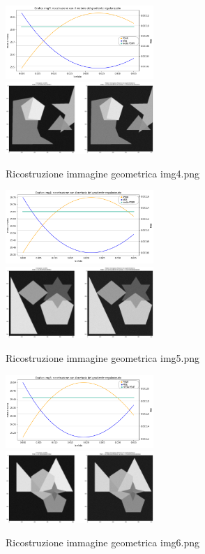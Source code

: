 \begin{figure}[H]
    \includegraphics[width=0.5\textwidth]{IMMAGINI_RELAZIONE/grafico4Tik.png}
    \includegraphics[width=0.5\textwidth]{IMMAGINI_RELAZIONE/ricostruzione4Tik.png}
    \caption{Ricostruzione immagine geometrica img4.png}

    \includegraphics[width=0.5\textwidth]{IMMAGINI_RELAZIONE/grafico5Tik.png}
    \includegraphics[width=0.5\textwidth]{IMMAGINI_RELAZIONE/ricostruzione5Tik.png}
    \caption{Ricostruzione immagine geometrica img5.png}

    \includegraphics[width=0.5\textwidth]{IMMAGINI_RELAZIONE/grafico6Tik.png}
    \includegraphics[width=0.5\textwidth]{IMMAGINI_RELAZIONE/ricostruzione6Tik.png}
    \caption{Ricostruzione immagine geometrica img6.png}


\end{figure}

